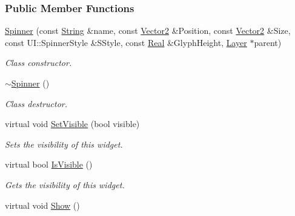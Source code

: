 \subsubsection*{Public Member Functions}
\begin{DoxyCompactItemize}
\item 
\hyperlink{classphys_1_1UI_1_1Spinner_ab82a06990b7422d1c028069608b32d85}{Spinner} (const \hyperlink{namespacephys_aa03900411993de7fbfec4789bc1d392e}{String} \&name, const \hyperlink{classphys_1_1Vector2}{Vector2} \&Position, const \hyperlink{classphys_1_1Vector2}{Vector2} \&Size, const UI::SpinnerStyle \&SStyle, const \hyperlink{namespacephys_af7eb897198d265b8e868f45240230d5f}{Real} \&GlyphHeight, \hyperlink{classphys_1_1UI_1_1Layer}{Layer} $\ast$parent)
\begin{DoxyCompactList}\small\item\em Class constructor. \item\end{DoxyCompactList}\item 
\hypertarget{classphys_1_1UI_1_1Spinner_adc7629a1ef57ef62a4e453ce3c66d808}{
\hyperlink{classphys_1_1UI_1_1Spinner_adc7629a1ef57ef62a4e453ce3c66d808}{$\sim$Spinner} ()}
\label{classphys_1_1UI_1_1Spinner_adc7629a1ef57ef62a4e453ce3c66d808}

\begin{DoxyCompactList}\small\item\em Class destructor. \item\end{DoxyCompactList}\item 
virtual void \hyperlink{classphys_1_1UI_1_1Spinner_a4fddc28f38174c4a89761efa00ae88c3}{SetVisible} (bool visible)
\begin{DoxyCompactList}\small\item\em Sets the visibility of this widget. \item\end{DoxyCompactList}\item 
virtual bool \hyperlink{classphys_1_1UI_1_1Spinner_a3bb14ddd6426debf035e65b9885bc25b}{IsVisible} ()
\begin{DoxyCompactList}\small\item\em Gets the visibility of this widget. \item\end{DoxyCompactList}\item 
\hypertarget{classphys_1_1UI_1_1Spinner_ac30c60ae55de67078a09c2d996a694fa}{
virtual void \hyperlink{classphys_1_1UI_1_1Spinner_ac30c60ae55de67078a09c2d996a694fa}{Show} ()}
\label{classphys_1_1UI_1_1Spinner_ac30c60ae55de67078a09c2d996a694fa}


\end{DoxyCompactItemize}
